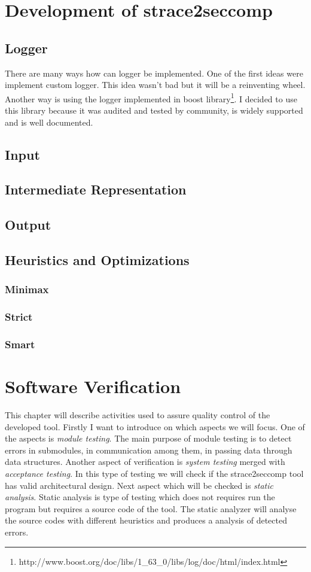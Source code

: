 \chapter{Development of strace2seccomp}
\section{Logger}
There are many ways how can logger be implemented.
One of the first ideas were implement custom logger.
This idea wasn't bad but it will be a reinventing wheel.
Another way is using the logger implemented in boost library\footnote{http://www.boost.org/doc/libs/1\_63\_0/libs/log/doc/html/index.html}.
I decided to use this library because it was audited and tested by community, is widely supported and is well documented.
\section{Input}
\section{Intermediate Representation}
\section{Output}
\section{Heuristics and Optimizations}
\subsection{Minimax}
\subsection{Strict}
\subsection{Smart}


\chapter{Software Verification}
This chapter will describe activities used to assure quality control of the developed tool.
Firstly I want to introduce on which aspects we will focus.
One of the aspects is \textit{module testing}.
The main purpose of module testing is to detect errors in submodules, in communication among them, in passing data through data structures.
Another aspect of verification is \textit{system testing} merged with \textit{acceptance testing}.
In this type of testing we will check if the strace2seccomp tool has valid architectural design.
Next aspect which will be checked is \textit{static analysis}.
Static analysis is type of testing which does not requires run the program but requires a source code of the tool.
The static analyzer will analyse the source codes with different heuristics and produces a analysis of detected errors. %



